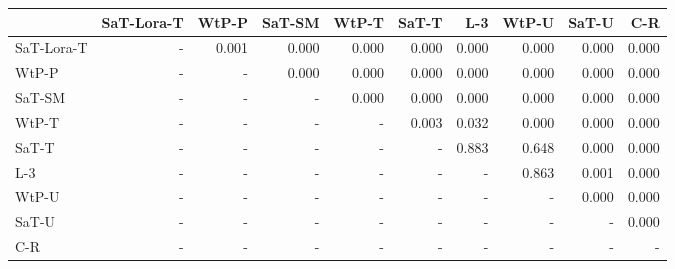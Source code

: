 \begin{tabular}{lrrrrrrrrr}
\toprule
 & SaT-Lora-T & WtP-P & SaT-SM & WtP-T & SaT-T & L-3 & WtP-U & SaT-U & C-R \\
\midrule
SaT-Lora-T & - & 0.001 & 0.000 & 0.000 & 0.000 & 0.000 & 0.000 & 0.000 & 0.000 \\
WtP-P & - & - & 0.000 & 0.000 & 0.000 & 0.000 & 0.000 & 0.000 & 0.000 \\
SaT-SM & - & - & - & 0.000 & 0.000 & 0.000 & 0.000 & 0.000 & 0.000 \\
WtP-T & - & - & - & - & 0.003 & 0.032 & 0.000 & 0.000 & 0.000 \\
SaT-T & - & - & - & - & - & 0.883 & 0.648 & 0.000 & 0.000 \\
L-3 & - & - & - & - & - & - & 0.863 & 0.001 & 0.000 \\
WtP-U & - & - & - & - & - & - & - & 0.000 & 0.000 \\
SaT-U & - & - & - & - & - & - & - & - & 0.000 \\
C-R & - & - & - & - & - & - & - & - & - \\
\bottomrule
\end{tabular}

